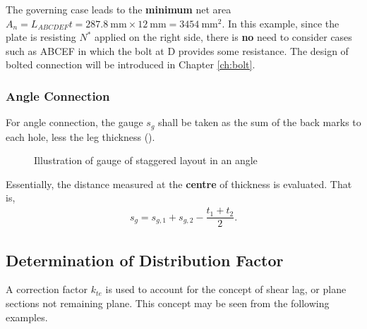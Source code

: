 \begin{solution}
\begin{itemize}
\begin{gather*}
\begin{split}
\end{split}
\end{gather*}
\end{itemize}
The governing case leads to the \textbf{minimum} net area $A_n=L_{ABCDEF}t=\SI{287.8}{\mm}\times\SI{12}{\mm}=\SI{3454}{\mm^2}$.
In this example, since the plate is resisting $N^*$ applied on the right side, there is \textbf{no} need to consider cases such as ABCEF in which the bolt at D provides some resistance.
The design of bolted connection will be introduced in Chapter \ref{ch:bolt}.
\end{solution}
\subsubsection{Angle Connection}
For angle connection, the gauge $s_g$ shall be taken as the sum of the back marks to each hole, less the leg thickness ().
\begin{figure}[H]
\centering

\caption{Illustration of gauge of staggered layout in an angle}
\end{figure}
Essentially, the distance measured at the \textbf{centre} of thickness is evaluated.
That is,
\begin{gather}
s_g=s_{g,1}+s_{g,2}-\dfrac{t_1+t_2}{2}.
\end{gather}
\subsection{Determination of Distribution Factor}
A correction factor $k_{te}$ is used to account for the concept of shear lag, or plane sections not remaining plane.
This concept may be seen from the following examples.
\begin{figure}[H]
\centering

\end{figure}

